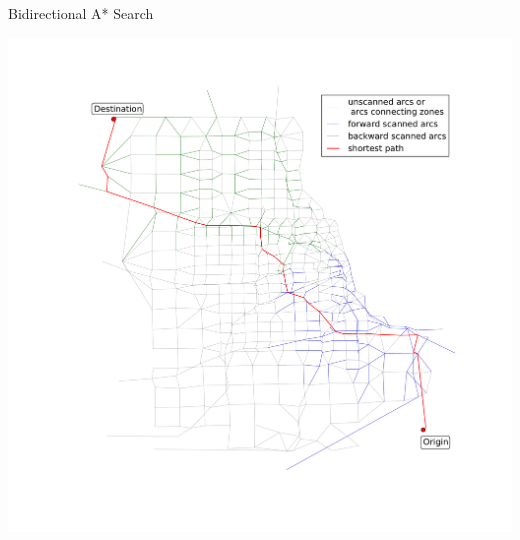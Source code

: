 \documentclass[handout]{beamer}
\begin{document}
\begin{frame}[shrink]{Bidirectional A* Search}
    \begin{center}
        \includegraphics[width=\paperwidth, height=\paperheight, keepaspectratio,trim=0 120px 48px 120px,clip]{img/chicago_astar_bidirect}
    \end{center}
\end{frame}
\end{document}
